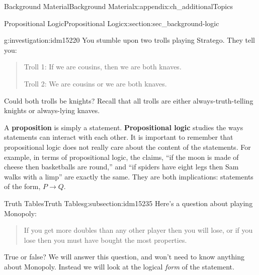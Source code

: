 \documentclass[oneside,10pt,]{book}
\newcommand{\terminology}[1]{\textbf{#1}}
\numberwithin{equation}{chapter}
\def\imp{\rightarrow}
\begin{document}
\begin{appendixptx}{Background Material}{}{Background Material}{}{}{x:appendix:ch_additionalTopics}
\typeout{************************************************}
%
\begin{sectionptx}{Propositional Logic}{}{Propositional Logic}{}{}{x:section:sec_background-logic}
\begin{introduction}{}%
\begin{investigation}{}{g:investigation:idm15220}%
You stumble upon two trolls playing Stratego\textregistered{}.  They tell you:%
\begin{quote}%
Troll 1: If we are cousins, then we are both knaves.%
\par
Troll 2: We are cousins or we are both knaves.%
\end{quote}
Could both trolls be knights?  Recall that all trolls are either always-truth-telling knights or always-lying knaves.%
\end{investigation}
A \terminology{proposition} is simply a statement. \terminology{Propositional logic} studies the ways statements can interact with each other. It is important to remember that propositional logic does not really care about the content of the statements. For example, in terms of propositional logic, the claims, ``if the moon is made of cheese then basketballs are round,'' and ``if spiders have eight legs then Sam walks with a limp'' are exactly the same. They are both implications: statements of the form, \(P \imp Q\).%
\end{introduction}%
%
%
\typeout{************************************************}
\typeout{************************************************}
%
\begin{subsectionptx}{Truth Tables}{}{Truth Tables}{}{}{g:subsection:idm15235}
%
Here's a question about playing Monopoly:%
\begin{quote}%
If you get more doubles than any other player then you will lose, or if you lose then you must have bought the most properties.%
\end{quote}
True or false? We will answer this question, and won't need to know anything about Monopoly. Instead we will look at the logical \emph{form} of the statement.%
\par

\end{subsectionptx}
\end{sectionptx}
\end{appendixptx}
\end{document}
